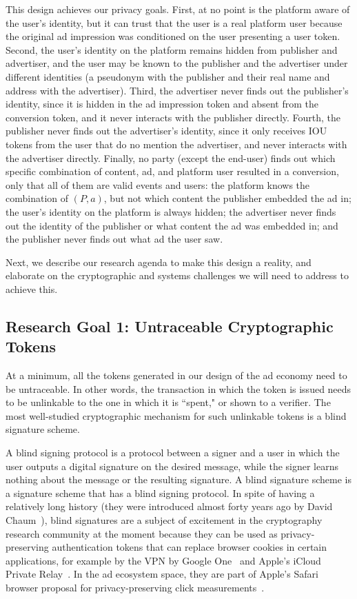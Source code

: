 %
This design achieves our privacy goals.
%
First, at no point is the platform aware of the user's identity, but it can trust that the user is a real platform user because the original ad impression was conditioned on the user presenting a user token.
%
Second, the user's identity on the platform remains hidden from publisher and advertiser, and the user may be known to the publisher and the advertiser under different identities (\eg a pseudonym with the publisher and their real name and address with the advertiser).
%
Third, the advertiser never finds out the publisher's identity, since it is hidden in the ad impression token and absent from the conversion token, and it never interacts with the publisher directly.
%
Fourth, the publisher never finds out the advertiser's identity, since it only receives IOU tokens from the user that do no mention the advertiser, and never interacts with the advertiser directly.
%
Finally, no party (except the end-user) finds out which specific combination of content, ad, and platform user resulted in a conversion, only that all of them are valid events and users: the platform knows the combination of $(P, a)$, but not which content the publisher embedded the ad in; the user's identity on the platform is always hidden; the advertiser never finds out the identity of the publisher or what content the ad was embedded in; and the publisher never finds out what ad the user saw.
%

%
Next, we describe our research agenda to make this design a reality, and elaborate on the cryptographic and systems challenges we will need to address to achieve this.
%

\subsection{Research Goal 1: Untraceable Cryptographic Tokens}
\label{rg1}

At a minimum, all the tokens generated in our design of the ad economy need to be untraceable.  In other words, the transaction in which the token is issued needs to be unlinkable to the one in which it is ``spent," or shown to a verifier.  The most well-studied cryptographic mechanism for such unlinkable tokens is a blind signature scheme.  

A blind signing protocol is a protocol between a signer and a user in which the user outputs a digital signature on the desired message, while the signer learns nothing about the message or the resulting signature.
A blind signature scheme is a signature scheme that has a blind signing protocol.  In spite of having a relatively long history (they were introduced almost forty years ago by David Chaum~\cite{C:Chaum82}), blind signatures are a subject of excitement in the cryptography research community at the moment because they can be used as privacy-preserving authentication tokens that can replace browser cookies in certain applications, for example by the VPN by Google One~\cite{google-one-vpn} and Apple's iCloud Private Relay~\cite{apple-private-relay}. In the ad ecosystem space, they are part of 
Apple's Safari browser proposal for privacy-preserving click measurements~\cite{safari-clicks}.

